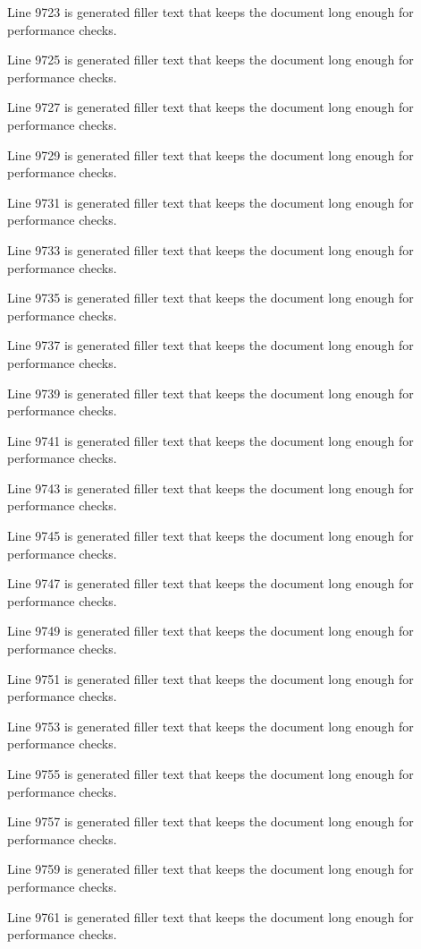 Line 9723 is generated filler text that keeps the document long enough for performance checks.

Line 9725 is generated filler text that keeps the document long enough for performance checks.

Line 9727 is generated filler text that keeps the document long enough for performance checks.

Line 9729 is generated filler text that keeps the document long enough for performance checks.

Line 9731 is generated filler text that keeps the document long enough for performance checks.

Line 9733 is generated filler text that keeps the document long enough for performance checks.

Line 9735 is generated filler text that keeps the document long enough for performance checks.

Line 9737 is generated filler text that keeps the document long enough for performance checks.

Line 9739 is generated filler text that keeps the document long enough for performance checks.

Line 9741 is generated filler text that keeps the document long enough for performance checks.

Line 9743 is generated filler text that keeps the document long enough for performance checks.

Line 9745 is generated filler text that keeps the document long enough for performance checks.

Line 9747 is generated filler text that keeps the document long enough for performance checks.

Line 9749 is generated filler text that keeps the document long enough for performance checks.

Line 9751 is generated filler text that keeps the document long enough for performance checks.

Line 9753 is generated filler text that keeps the document long enough for performance checks.

Line 9755 is generated filler text that keeps the document long enough for performance checks.

Line 9757 is generated filler text that keeps the document long enough for performance checks.

Line 9759 is generated filler text that keeps the document long enough for performance checks.

Line 9761 is generated filler text that keeps the document long enough for performance checks.

